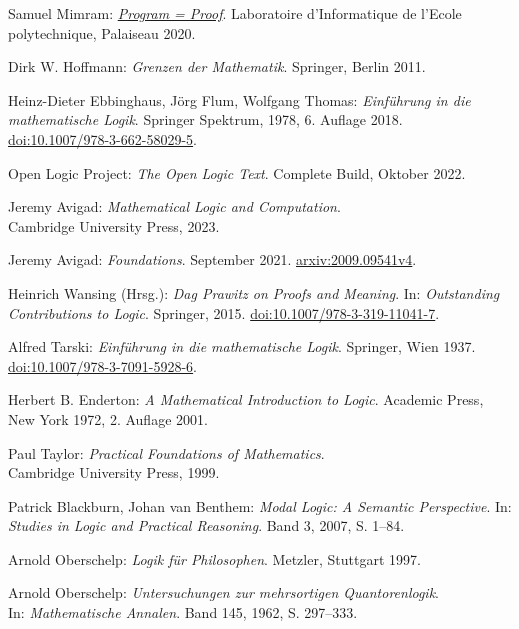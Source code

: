 \begin{thebibliography}{00}
Samuel Mimram:
\emph{\href{https://www.lix.polytechnique.fr/Labo/Samuel.Mimram/publications/}%
{Program = Proof}}.
Laboratoire d'Informatique de l'Ecole polytechnique, Palaiseau 2020.

Dirk W. Hoffmann: \emph{Grenzen der Mathematik}.
Springer, Berlin 2011.

Heinz-Dieter Ebbinghaus, Jörg Flum, Wolfgang Thomas:
\emph{Einführung in die mathematische Logik}.
Springer Spektrum, 1978, 6. Auflage 2018.\\
\href{https://doi.org/10.1007/978-3-662-58029-5}%
{doi:10.1007/978-3-662-58029-5}.

 Open Logic Project:
\emph{The Open Logic Text}. Complete Build, Oktober 2022.

 Jeremy Avigad:
\emph{Mathematical Logic and Computation}.\\
Cambridge University Press, 2023.

 Jeremy Avigad: \emph{Foundations}.
September 2021. \href{https://arxiv.org/abs/2009.09541v4}{arxiv:2009.09541v4}.

 Heinrich Wansing (Hrsg.):
\emph{Dag Prawitz on Proofs and Meaning}.
In: \emph{Outstanding Contributions to Logic}. Springer, 2015.
\href{https://doi.org/10.1007/978-3-319-11041-7}{doi:10.1007/978-3-319-11041-7}.

 Alfred Tarski:
\emph{Einführung in die mathematische Logik}. Springer, Wien 1937.\\
\href{https://doi.org/10.1007/978-3-7091-5928-6}{doi:10.1007/978-3-7091-5928-6}.

 Herbert B. Enderton:
\emph{A Mathematical Introduction to Logic}.
Academic Press, New York 1972, 2. Auflage 2001.

 Paul Taylor:
\emph{Practical Foundations of Mathematics}.\\
Cambridge University Press, 1999.

 Patrick Blackburn, Johan van Benthem:
\emph{Modal Logic: A Semantic Perspective}.
In: \emph{Studies in Logic and Practical Reasoning}.
Band 3, 2007, S. 1--84.

 Arnold Oberschelp:
\emph{Logik für Philosophen}. Metzler, Stuttgart 1997.

 Arnold Oberschelp:
\emph{Untersuchungen zur mehrsortigen Quantorenlogik}.\\
In: \emph{Mathematische Annalen}. Band 145, 1962, S. 297--333.


\end{thebibliography}
